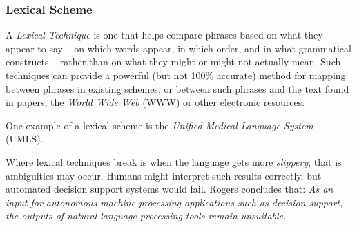 %
%
%
%
%
%
%

\subsubsection{Lexical Scheme}
\label{lexical_scheme_heading}

A \emph{Lexical Technique} is one that helps compare phrases based on what they
appear to say -- on which words appear, in which order, and in what grammatical
constructs -- rather than on what they might or might not actually mean. Such
techniques can provide a powerful (but not 100\% accurate) method for mapping
between phrases in existing schemes, or between such phrases and the text found
in papers, the \emph{World Wide Web} (WWW) or other electronic resources.

One example of a lexical scheme is the \emph{Unified Medical Language System}
(UMLS).

Where lexical techniques break is when the language gets more \emph{slippery},
that is ambiguities may occur. Humans might interpret such results correctly,
but automated decision support systems would fail. Rogers \cite{rogers}
concludes that: \textit{As an input for autonomous machine processing
applications such as decision support, the outputs of natural language
processing tools remain unsuitable.}
